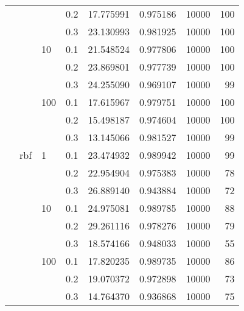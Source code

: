 \begin{table}[H]
\begin{tabular}{llllrrrr}
           &     &     & 0.2 &  17.775991 &  0.975186 &   10000 &   100 \\
           &     &     & 0.3 &  23.130993 &  0.981925 &   10000 &   100 \\
           &     & 10  & 0.1 &  21.548524 &  0.977806 &   10000 &   100 \\
           &     &     & 0.2 &  23.869801 &  0.977739 &   10000 &   100 \\
           &     &     & 0.3 &  24.255090 &  0.969107 &   10000 &    99 \\
           &     & 100 & 0.1 &  17.615967 &  0.979751 &   10000 &   100 \\
           &     &     & 0.2 &  15.498187 &  0.974604 &   10000 &   100 \\
           &     &     & 0.3 &  13.145066 &  0.981527 &   10000 &    99 \\
           & rbf & 1   & 0.1 &  23.474932 &  0.989942 &   10000 &    99 \\
           &     &     & 0.2 &  22.954904 &  0.975383 &   10000 &    78 \\
           &     &     & 0.3 &  26.889140 &  0.943884 &   10000 &    72 \\
           &     & 10  & 0.1 &  24.975081 &  0.989785 &   10000 &    88 \\
           &     &     & 0.2 &  29.261116 &  0.978276 &   10000 &    79 \\
           &     &     & 0.3 &  18.574166 &  0.948033 &   10000 &    55 \\
           &     & 100 & 0.1 &  17.820235 &  0.989735 &   10000 &    86 \\
           &     &     & 0.2 &  19.070372 &  0.972898 &   10000 &    73 \\
           &     &     & 0.3 &  14.764370 &  0.936868 &   10000 &    75 \\
\bottomrule
\end{tabular}
\end{table}
